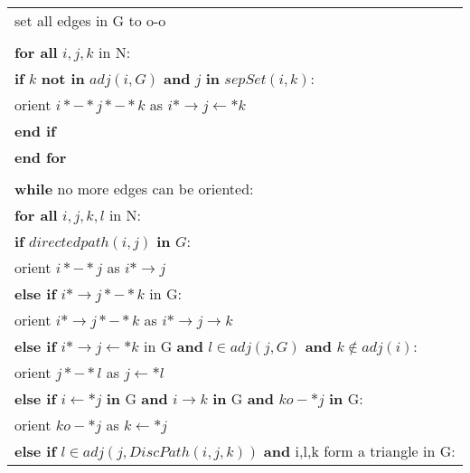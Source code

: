 \documentclass{article}
\begin{document}
\begin{longtable}{|l l|}
		\multicolumn{2}{|l|}{set all edges in G to o-o}\\
		&\\
		\multicolumn{2}{|l|}{\textbf{for all} $ i,j,k $ in N:}\\
		\multicolumn{2}{|l|}{\quad\textbf{if} $ k $ \textbf{not in} $ adj(i,G) $ \textbf{and} $ j $ \textbf{in} $sepSet( i,k)$:}\\
		\multicolumn{2}{|l|}{\quad\quad orient $ i*-*j*-*k $ as $ i*\rightarrow j \leftarrow *k $ }\\
		\multicolumn{2}{|l|}{\quad\textbf{end if}}\\
		\multicolumn{2}{|l|}{\textbf{end for}}\\
		&\\
		
		\multicolumn{2}{|l|}{\textbf{while} no more edges can be oriented:}\\
		\multicolumn{2}{|l|}{\quad\textbf{for all} $ i,j,k,l $ in N:}\\
		\multicolumn{2}{|l|}{\quad\quad\textbf{if} $ directedpath(i,j)$ \textbf{in} $G $:}\\
		\multicolumn{2}{|l|}{\quad\quad\quad orient $ i*-*j $ as $ i*\rightarrow j $ }\\
		
		\multicolumn{2}{|l|}{\quad\quad\textbf{else if} $i*\rightarrow j *-* k$ in G: }\\
		
		\multicolumn{2}{|l|}{\quad\quad\quad orient $i*\rightarrow j *-* k$ as $i*\rightarrow j \rightarrow k$}\\
		
		\multicolumn{2}{|l|}{\quad\quad\textbf{else if} $i*\rightarrow j \leftarrow * k$ in G \textbf{and} $l \in adj(j,G)$ \textbf{and} $k \notin adj(i)$: }\\
		
		\multicolumn{2}{|l|}{\quad\quad\quad orient $j *-* l$ as $j \leftarrow *l$}\\
		
		\multicolumn{2}{|l|}{\quad\quad\textbf{else if} $i\leftarrow* j$ \textbf{in} G \textbf{and} $i\rightarrow k$ \textbf{in} G \textbf{and} $k o-* j$ \textbf{in} G: }\\
		
		\multicolumn{2}{|l|}{\quad\quad\quad orient $k o-* j$ as $k \leftarrow* j$}\\
		
		\multicolumn{2}{|l|}{\quad\quad\textbf{else if} $l \in adj(j,DiscPath(i,j,k))$ \textbf{and} i,l,k form a triangle in G:}\\
		

\end{longtable}
\end{document}
